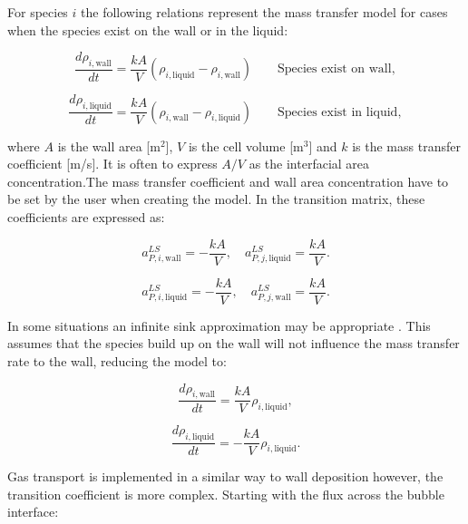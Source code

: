 For species $i$ the following relations represent the mass transfer model for cases when the species exist on the wall or in the liquid:

\begin{equation}
    \frac{d\rho_{i, \text{wall}}}{dt} = \frac{kA}{V}(\rho_{i, \text{liquid}} - \rho_{i,\text{wall}}) \quad \quad \text{Species exist on wall},
\end{equation}

\begin{equation}
    \frac{d\rho_{i, \text{liquid}}}{dt} = \frac{kA}{V}(\rho_{i,\text{wall}} - \rho_{i,\text{liquid}}) \quad \quad \text{Species exist in liquid},
\end{equation}

\noindent where $A$ is the wall area [m$^2$], $V$ is the cell volume [m$^3$] and $k$ is the mass transfer coefficient [m/s]. It is often to express $A/V$ as the interfacial area concentration.The mass transfer coefficient and wall area concentration have to be set by the user when creating the model. In the transition matrix, these coefficients are expressed as:

\begin{equation}
    a^{LS}_{P,i, \text{wall}} = -\frac{kA}{V}, \quad 
    a^{LS}_{P,j, \text{liquid}} = \frac{kA}{V}.
\end{equation}

\begin{equation}
    a^{LS}_{P,i, \text{liquid}} = -\frac{kA}{V}, \quad 
    a^{LS}_{P,j, \text{wall}} = \frac{kA}{V}.
\end{equation}

\noindent In some situations an infinite sink approximation may be appropriate \cite{kedl1972}. This assumes that the species build up on the wall will not influence the mass transfer rate to the wall, reducing the model to: 

\begin{equation}
    \frac{d\rho_{i, \text{wall}}}{dt} = \frac{kA}{V}\rho_{i,\text{liquid}},
\end{equation}

\begin{equation}
    \frac{d\rho_{i, \text{liquid}}}{dt} = -\frac{kA}{V}\rho_{i,\text{liquid}}.
\end{equation}

Gas transport is implemented in a similar way to wall deposition however, the transition coefficient is more complex. Starting with the flux across the bubble interface:

